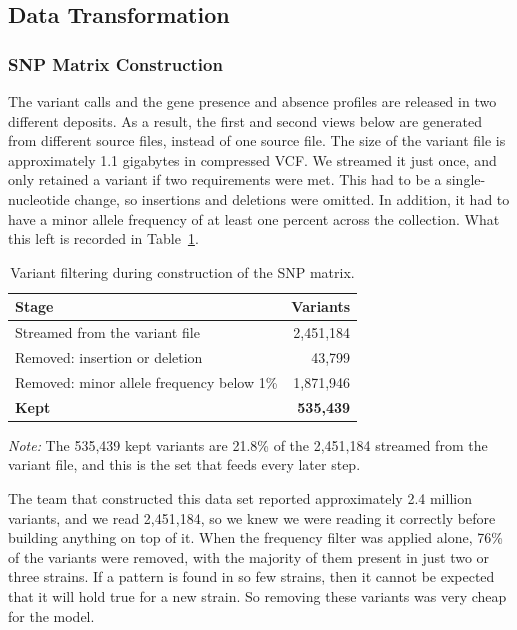 \documentclass[journal]{IEEEtran}
\begin{document}
\subsection{Data Transformation}
\label{sec:datatransform}

\subsubsection{SNP Matrix Construction}
The variant calls and the gene presence and absence profiles are released in two
different deposits. As a result, the first and second views below are generated
from different source files, instead of one source file. The size of the variant
file is approximately 1.1 gigabytes in compressed VCF. We streamed it just once,
and only retained a variant if two requirements were met. This had to be a
single-nucleotide change, so insertions and deletions were omitted. In addition, it
had to have a minor allele frequency of at least one percent across the collection.
What this left is recorded in Table~\ref{tab:variants}.

\begin{table}[!tb]
\caption{Variant filtering during construction of the SNP matrix.}
\label{tab:variants}
\centering
\small
\setlength{\tabcolsep}{4pt}
\renewcommand{\arraystretch}{1.05}
\begin{tabular}{|l|r|}
\hline
\rowcolor{headgrey}
\textbf{Stage} & \textbf{Variants} \\ \hline
Streamed from the variant file & 2,451,184 \\ \hline
Removed: insertion or deletion &    43,799 \\ \hline
Removed: minor allele frequency below 1\% & 1,871,946 \\ \hline
\rowcolor{oursblue}
\textbf{Kept} & \textbf{535,439} \\ \hline
\end{tabular}
\renewcommand{\arraystretch}{1.0}
\vspace{0.4em}

\noindent\footnotesize\textit{Note:} The 535,439 kept variants are 21.8\% of the 2,451,184
streamed from the variant file, and this is the set that feeds every later step.
\end{table}

The team that constructed this data set reported approximately 2.4 million
variants, and we read 2,451,184, so we knew we were reading it correctly before
building anything on top of it. When the frequency filter was applied alone, 76\%
of the variants were removed, with the majority of them present in just two or
three strains. If a pattern is found in so few strains, then it cannot be expected
that it will hold true for a new strain. So removing these variants was very cheap
for the model.
\end{document}
